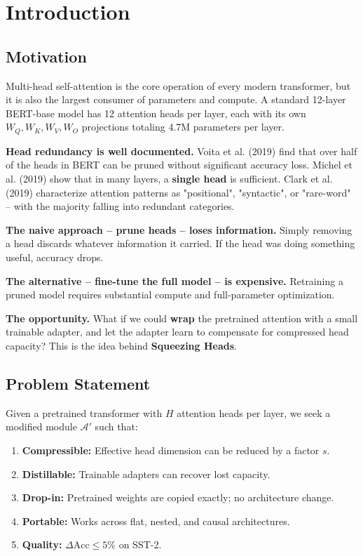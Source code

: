 
\section{Introduction}

\subsection{Motivation}

Multi-head self-attention is the core operation of every modern transformer, 
but it is also the largest consumer of parameters and compute. A standard 
12-layer BERT-base model has 12 attention heads per layer, each with its own 
$W_Q, W_K, W_V, W_O$ projections totaling 4.7M parameters per layer.

\textbf{Head redundancy is well documented.} Voita et al. (2019) find that over 
half of the heads in BERT can be pruned without significant accuracy loss. 
Michel et al. (2019) show that in many layers, a \textbf{single head} is 
sufficient. Clark et al. (2019) characterize attention patterns as 
"positional", "syntactic", or "rare-word" -- with the majority falling into 
redundant categories.

\textbf{The naive approach -- prune heads -- loses information.} Simply removing 
a head discards whatever information it carried. If the head was doing 
something useful, accuracy drops.

\textbf{The alternative -- fine-tune the full model -- is expensive.} Retraining a 
pruned model requires substantial compute and full-parameter optimization.

\textbf{The opportunity.} What if we could \textbf{wrap} the pretrained attention with 
a small trainable adapter, and let the adapter learn to compensate for 
compressed head capacity? This is the idea behind \textbf{Squeezing Heads}.

\subsection{Problem Statement}

Given a pretrained transformer with $H$ attention heads per layer, we seek 
a modified module $\mathcal{A}'$ such that:

\begin{enumerate}
\item \textbf{Compressible:} Effective head dimension can be reduced by a factor $s$.
\item \textbf{Distillable:} Trainable adapters can recover lost capacity.
\item \textbf{Drop-in:} Pretrained weights are copied exactly; no architecture change.
\item \textbf{Portable:} Works across flat, nested, and causal architectures.
\item \textbf{Quality:} $\Delta\text{Acc} \leq 5\%$ on SST-2.

\end{enumerate}
